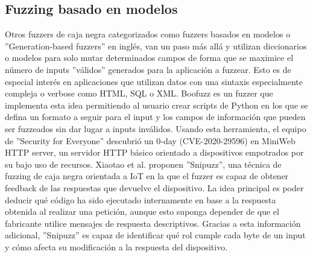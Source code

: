 \subsection{Fuzzing basado en modelos}
Otros fuzzers de caja negra categorizados como fuzzers basados en modelos o ''Generation-based fuzzers''\cite{Felderer2016} en inglés, van un paso más allá y utilizan diccionarios o modelos para solo 
mutar determinados campos de forma que se maximice el número de inputs ''válidos'' generados para la aplicación a fuzzear. Esto es de 
especial interés en aplicaciones que utilizan datos con una sintaxis especialmente compleja o verbose como HTML, SQL o XML.
Boofuzz\cite{boofuzz} es un fuzzer que implementa esta idea permitiendo al usuario crear scripts de Python en los que 
se defina un formato a seguir para el input y los campos de información que pueden ser fuzzeados sin dar lugar a inputs 
inválidos. Usando esta herramienta, el equipo de ''Security for Everyone'' descubrió un 0-day (CVE-2020-29596)\cite{securityforeveryone}
en MiniWeb HTTP server, un servidor HTTP básico orientado a dispositivos empotrados por su bajo uso de recursos.
Xiaotao et al.\cite{snipuzz} proponen ''Snipuzz'', una técnica de fuzzing de caja negra orientada a IoT en la que el fuzzer es capaz de obtener feedback 
de las respuestas que devuelve el dispositivo. La idea principal es poder deducir qué código ha sido ejecutado internamente en base a 
la respuesta obtenida al realizar una petición, aunque esto suponga depender de que el fabricante utilice mensajes de respuesta descriptivos.
Gracias a esta información adicional, ''Snipuzz'' es capaz de identificar qué rol cumple cada 
byte de un input y cómo afecta su modificación a la respuesta del dispositivo.

